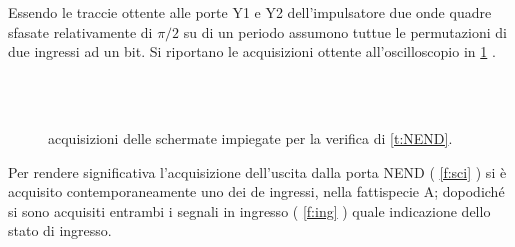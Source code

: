 	Essendo le traccie ottente alle porte Y1 e Y2 dell'impulsatore due onde quadre 
	sfasate relativamente di $\pi/2$ su di un periodo assumono tuttue le permutazioni di due ingressi ad un bit.
	Si riportano le acquisizioni ottente all'oscilloscopio in \figurename{ \ref{f:osci}} .
	\begin{figure}[hb]
		\centering
		\\
	\\
	\caption{acquisizioni delle schermate impiegate per la verifica di \tablename{ \ref{t:NEND}}.}
	\label{f:osci}
\end{figure}

	Per rendere significativa l'acquisizione dell'uscita dalla porta NEND ( \figurename{ \ref{f:sci}} ) si è acquisito contemporaneamente uno dei de ingressi, nella fattispecie A; dopodiché si sono acquisiti entrambi i segnali  in ingresso (\figurename{ \ref{f:ing}} ) quale indicazione dello stato di ingresso.
	
